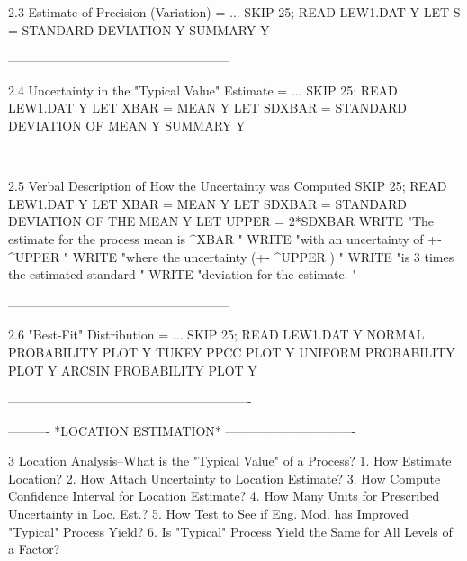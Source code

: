2.3
Estimate of Precision (Variation) = ...
      SKIP 25; READ LEW1.DAT Y
      LET S = STANDARD DEVIATION Y
      SUMMARY Y
 
-----------------------------------------------------
 
2.4
Uncertainty in the "Typical Value" Estimate = ...
      SKIP 25; READ LEW1.DAT Y
      LET XBAR = MEAN Y
      LET SDXBAR = STANDARD DEVIATION OF MEAN Y
      SUMMARY Y
 
-----------------------------------------------------
 
2.5
Verbal Description of How the Uncertainty was Computed
      SKIP 25; READ LEW1.DAT Y
      LET XBAR = MEAN Y
      LET SDXBAR = STANDARD DEVIATION OF THE MEAN Y
      LET UPPER = 2*SDXBAR
      WRITE "The estimate for the process mean is ^XBAR "
      WRITE "with an uncertainty of +- ^UPPER "
      WRITE "where the uncertainty (+- ^UPPER ) "
      WRITE "is 3 times the estimated standard "
      WRITE "deviation for the estimate. "
 
 
-----------------------------------------------------
 
2.6
"Best-Fit" Distribution = ...
      SKIP 25; READ LEW1.DAT Y
      NORMAL PROBABILITY PLOT Y
      TUKEY PPCC PLOT Y
      UNIFORM PROBABILITY PLOT Y
      ARCSIN PROBABILITY PLOT Y
 
----------------------------------------------------------
 
 
 
 
 
 
 
 
 
 
 
 
 
 
 
 
 
 
 
 
 
 
 
 
 
 
 
 
 
 
----------  *LOCATION ESTIMATION*  -------------------------------
 
3
Location Analysis--What is the "Typical Value" of a Process?
   1. How Estimate Location?
   2. How Attach Uncertainty to Location Estimate?
   3. How Compute Confidence Interval for Location Estimate?
   4. How Many Units for Prescribed Uncertainty in Loc. Est.?
   5. How Test to See if Eng. Mod. has Improved "Typical" Process Yield?
   6. Is "Typical" Process Yield the Same for All Levels of a Factor?
 
